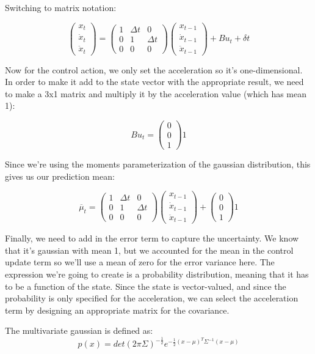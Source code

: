 \documentclass[10pt]{article}
\begin{document}
\begin{enumerate}
\begin{enumerate}
  Switching to matrix notation:

  $$
  \begin{pmatrix} x_t \\ \dot{x}_t \\ \ddot{x}_t \end{pmatrix} = 
  \begin{pmatrix} 1 & \Delta t & 0 \\ 0 & 1 & \Delta t  \\ 0 & 0 & 0 \end{pmatrix} 
  \begin{pmatrix} x_{t-1} \\ \dot{x}_{t-1} \\ \ddot{x}_{t-1} \end{pmatrix} + B u_t + \delta t
  $$

  Now for the control action, we only set the acceleration so it's
  one-dimensional. In order to make it add to the state vector with the
  appropriate result, we need to make a 3x1 matrix and multiply it by the
  acceleration value (which has mean 1):

  $$ B u_t = \begin{pmatrix} 0 \\ 0 \\ 1 \end{pmatrix} 1$$

  Since we're using the moments parameterization of the gaussian distribution,
  this gives us our prediction mean:

  $$ 
  \overline{\mu}_t = \begin{pmatrix} 1 & \Delta t & 0 \\ 0 & 1 & \Delta t  \\ 0 & 0 & 0 \end{pmatrix}
  \begin{pmatrix} x_{t-1} \\ \dot{x}_{t-1} \\ \ddot{x}_{t-1} \end{pmatrix} + 
  \begin{pmatrix} 0 \\ 0 \\ 1 \end{pmatrix} 1
  $$

  Finally, we need to add in the error term to capture the uncertainty. We know
  that it's gaussian with mean 1, but we accounted for the mean in the control
  update term so we'll use a mean of zero for the error variance here. The
  expression we're going to create is a probability distribution, meaning that
  it has to be a function of the state. Since the state is vector-valued, and
  since the probability is only specified for the acceleration, we can select
  the acceleration term by designing an appropriate matrix for the covariance.

  The multivariate gaussian is defined as: 
  $$ p(x) = det(2\pi \Sigma)^{-\frac{1}{2}} e^{-\frac{1}{2} (x - \mu)^T
  \Sigma^{-1} (x - \mu)} $$

\end{enumerate}

\end{enumerate}
\end{document}
